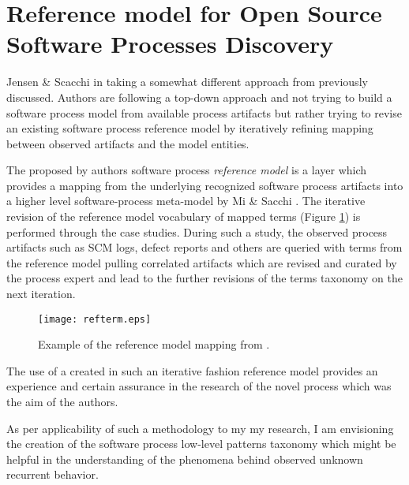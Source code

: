 \section{Reference model for Open Source Software Processes Discovery}
Jensen \& Scacchi in \cite{citeulike:5043664} taking a somewhat different approach from previously discussed. Authors are following a top-down approach and not trying to build a software process model from available process artifacts but rather trying to revise an existing software process reference model by iteratively refining mapping between observed artifacts and the model entities. 

The proposed by authors software process \textit{reference model} is a layer which provides a mapping from the underlying recognized software process artifacts into a higher level software-process meta-model by Mi \& Sacchi \cite{citeulike:5128872}. The iterative revision of the reference model vocabulary of mapped terms (Figure \ref{fig:refterm}) is performed through the case studies. During such a study, the observed process artifacts such as SCM logs, defect reports and others are queried with terms from the reference model pulling correlated artifacts which are revised and curated by the process expert and lead to the further revisions of the terms taxonomy on the next iteration.

\begin{figure}[tbp]
   \centering
   \texttt{[image: refterm.eps]}
   \caption{Example of the reference model mapping from \cite{citeulike:5043664}.}
   \label{fig:refterm}
\end{figure}

The use of a created in such an iterative fashion reference model provides an experience and certain assurance in the research of the novel process which was the aim of the authors. 

As per applicability of such a methodology to my my research, I am envisioning the creation of the software process low-level patterns taxonomy which might be helpful in the understanding of the phenomena behind observed unknown recurrent behavior.
